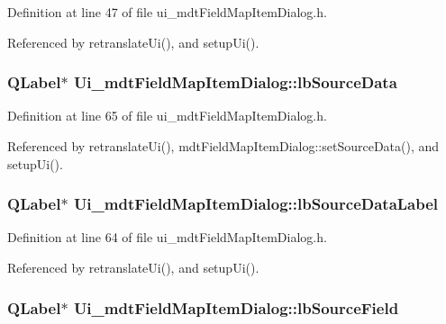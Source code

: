 Definition at line 47 of file ui\-\_\-mdt\-Field\-Map\-Item\-Dialog.\-h.



Referenced by retranslate\-Ui(), and setup\-Ui().

\hypertarget{class_ui__mdt_field_map_item_dialog_ad6174a4c1d79afc5d4a4d8e3e72f2bd1}{
\subsubsection[{lb\-Source\-Data}]{\setlength{\rightskip}{0pt plus 5cm}Q\-Label$\ast$ Ui\-\_\-mdt\-Field\-Map\-Item\-Dialog\-::lb\-Source\-Data}}\label{class_ui__mdt_field_map_item_dialog_ad6174a4c1d79afc5d4a4d8e3e72f2bd1}


Definition at line 65 of file ui\-\_\-mdt\-Field\-Map\-Item\-Dialog.\-h.



Referenced by retranslate\-Ui(), mdt\-Field\-Map\-Item\-Dialog\-::set\-Source\-Data(), and setup\-Ui().

\hypertarget{class_ui__mdt_field_map_item_dialog_ad8d1ee4b1da2b756f41037fa8f3cdb25}{
\subsubsection[{lb\-Source\-Data\-Label}]{\setlength{\rightskip}{0pt plus 5cm}Q\-Label$\ast$ Ui\-\_\-mdt\-Field\-Map\-Item\-Dialog\-::lb\-Source\-Data\-Label}}\label{class_ui__mdt_field_map_item_dialog_ad8d1ee4b1da2b756f41037fa8f3cdb25}


Definition at line 64 of file ui\-\_\-mdt\-Field\-Map\-Item\-Dialog.\-h.



Referenced by retranslate\-Ui(), and setup\-Ui().

\hypertarget{class_ui__mdt_field_map_item_dialog_a43283c1b7d55df6d995a376e4d895150}{
\subsubsection[{lb\-Source\-Field}]{\setlength{\rightskip}{0pt plus 5cm}Q\-Label$\ast$ Ui\-\_\-mdt\-Field\-Map\-Item\-Dialog\-::lb\-Source\-Field}}\label{class_ui__mdt_field_map_item_dialog_a43283c1b7d55df6d995a376e4d895150}


